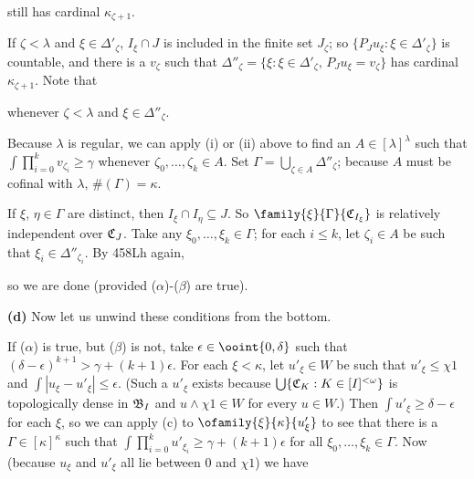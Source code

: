 {

\noindent still has cardinal $\kappa_{\zeta+1}$.

If $\zeta<\lambda$ and $\xi\in\Delta'_{\zeta}$,
$I_{\xi}\cap J$ is included in the
finite set $J_{\zeta}$;  so
$\{P_Ju_{\xi}:\xi\in\Delta'_{\zeta}\}$ is countable, and there is a
$v_{\zeta}$ such that
$\Delta''_{\zeta}=\{\xi:\xi\in\Delta'_{\zeta},\,P_Ju_{\xi}=v_{\zeta}\}$ has
cardinal $\kappa_{\zeta+1}$.   Note that


\noindent whenever $\zeta<\lambda$ and $\xi\in\Delta''_{\zeta}$.

Because $\lambda$ is regular, we can apply (i) or (ii) above to find an
$A\in[\lambda]^{\lambda}$ such that
$\int\prod_{i=0}^kv_{\zeta_i}\ge\gamma$ whenever
$\zeta_0,\ldots,\zeta_k\in A$.   Set
$\Gamma=\bigcup_{\zeta\in A}\Delta''_{\zeta}$;  because $A$ must be
cofinal with $\lambda$, $\#(\Gamma)=\kappa$.

If $\xi$, $\eta\in\Gamma$ are distinct, then
$I_{\xi}\cap I_{\eta}\subseteq J$.   So
$\family{\xi}{\Gamma}{\frak C_{I_{\xi}}}$ is
relatively independent over $\frak C_J$.   Take any
$\xi_0,\ldots,\xi_k\in\Gamma$;  for each $i\le k$, let $\zeta_i\in A$ be
such that $\xi_i\in\Delta''_{\zeta_i}$.   By 458Lh again,


\noindent so we are done (provided ($\alpha$)-($\beta$) are true).

\medskip

{\bf (d)} Now let us unwind these conditions from the bottom.

\medskip

 If ($\alpha$) is true, but ($\beta$) is not,
take $\epsilon\in\ooint{0,\delta}$ such that
$(\delta-\epsilon)^{k+1}>\gamma+(k+1)\epsilon$.   For each $\xi<\kappa$,
let $u'_{\xi}\in W$ be such that $u'_{\xi}\le\chi 1$ and
$\int|u_{\xi}-u'_{\xi}|\le\epsilon$.   (Such a $u'_{\xi}$ exists because
$\bigcup\{\frak C_K:K\in[I]^{<\omega}\}$ is topologically dense in
$\frak B_I$ and $u\wedge\chi 1\in W$ for every $u\in W$.)   Then
$\int u'_{\xi}\ge\delta-\epsilon$ for each $\xi$, so we can apply
(c) to $\ofamily{\xi}{\kappa}{u'_{\xi}}$ to see that there is a
$\Gamma\in[\kappa]^{\kappa}$ such that
$\int\prod_{i=0}^ku'_{\xi_i}\ge\gamma+(k+1)\epsilon$ for all
$\xi_0,\ldots,\xi_k\in\Gamma$.   Now (because $u_{\xi}$ and $u'_{\xi}$
all lie between $0$ and $\chi 1$) we have

}
